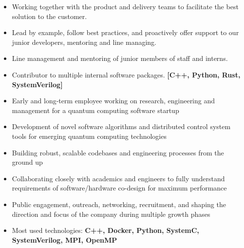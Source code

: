\documentclass[10pt,a4paper,ragged2e,withhyper]{altacv}
\begin{document}
\begin{paracol}{2}
\begin{itemize}
    \item
    Working together with the product and delivery teams to facilitate the
    best solution to the customer.
    
    \item
    Lead by example, follow best practices, and proactively offer support to our
    junior developers, mentoring and line managing.
    
    \item
    Line management and mentoring of junior members of staff and interns.
    
    \item
    Contributor to multiple internal software packages.
    {\bf [C++, Python, Rust, SystemVerilog]}

    \item
    Early and long-term employee working on research, engineering and
    management for a quantum computing software startup

    \item
    Development of novel software algorithms and distributed control system
    tools for emerging quantum computing technologies
    
    \item
    Building robust, scalable codebases and engineering processes from the
    ground up
    
    \item
    Collaborating closely with academics and engineers to fully understand
    requirements of software/hardware co-design for maximum performance
    
    \item
    Public engagement, outreach, networking, recruitment, and shaping the
    direction and focus of the company during multiple growth phases
    
    \item
    Most used technologies:
    {\bf C++, Docker, Python, SystemC, SystemVerilog, MPI, OpenMP}

\end{itemize}

\divider

 


\end{paracol}
\end{document}
